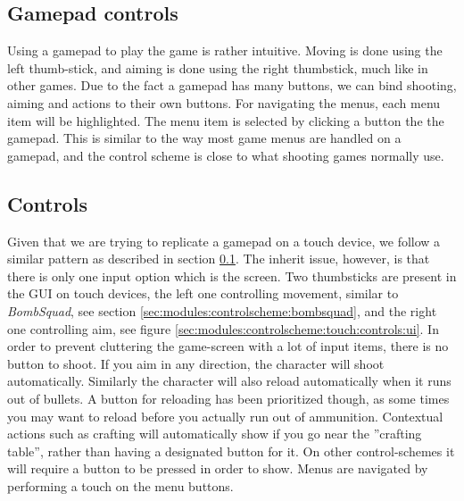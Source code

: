 
\subsection{Gamepad controls}\label{sec:modules:controlscheme:gamepad:controls}
Using a gamepad to play the game is rather intuitive. Moving is done using the left thumb-stick, and aiming is done using the right thumbstick, much like in other games.
Due to the fact a gamepad has many buttons, we can bind shooting, aiming and actions to their own buttons. 
For navigating the menus, each menu item will be highlighted. The menu item is selected by clicking a button the the gamepad.
This is similar to the way most game menus are handled on a gamepad, and the control scheme is close to what shooting games normally use.

\subsection{Controls}
Given that we are trying to replicate a gamepad on a touch device, we follow a similar pattern as described in section \ref{sec:modules:controlscheme:gamepad:controls}. The inherit issue, however, is that  there is only one input option which is the screen. 
Two thumbsticks are present in the GUI on touch devices, the left one controlling movement, similar to \textit{BombSquad}, see section \ref{sec:modules:controlscheme:bombsquad}, and the right one controlling aim, see figure \ref{sec:modules:controlscheme:touch:controls:ui}.
In order to prevent cluttering the game-screen with a lot of input items, there is no button to shoot. If you aim in any direction, the character will shoot automatically. Similarly the character will also reload  automatically when it runs out of bullets. A button for reloading has been prioritized though, as some times you may want to reload before you actually run out of ammunition.
Contextual actions such as crafting will automatically show if you go near the ''crafting table'', rather than having a designated button for it. On other control-schemes it will require a button to be pressed in order to show.
Menus are navigated by performing a touch on the menu buttons. 

